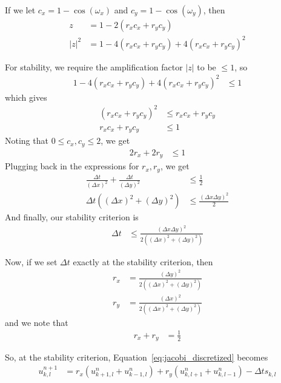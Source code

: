 \documentclass[twocolumn]{myarticle}
\numberwithin{equation}{section}
\begin{document}
If we let $ c_x = 1 - \cos\left( \omega_x \right) $ and $ c_y = 1 - \cos \left( \omega_y \right) $, then
\begin{align}
    z &= 1 - 2 \left(r_x c_x + r_y c_y \right)
    \\
    |z|^2 &= 1 - 4 \left( r_x c_x + r_y c_y \right) + 4 \left( r_x c_x + r_y c_y \right)^2
\end{align}

For stability, we require the amplification factor $ |z| $ to be $ \leq 1 $, so
\begin{align}
    1 - 4 \left( r_x c_x + r_y c_y \right) + 4 \left( r_x c_x + r_y c_y \right)^2 &\leq 1
\end{align}
which gives
\begin{align}
    \left( r_x c_x + r_y c_y \right)^2 &\leq r_x c_x + r_y c_y
    \\
    r_x c_x + r_y c_y &\leq 1
\end{align}
Noting that $ 0 \leq c_x, c_y \leq 2 $, we get
\begin{align}
    2 r_x + 2 r_y &\leq 1
\end{align}
Plugging back in the expressions for $ r_x, r_y $, we get
\begin{align}
    \frac{\Delta t}{\left( \Delta x \right)^2} + \frac{\Delta t}{\left( \Delta y \right)^2} &\leq \frac{1}{2}
    \\
    \Delta t \left( \left( \Delta x \right)^2 + \left( \Delta y \right)^2 \right) &\leq \frac{\left(\Delta x \Delta y \right)^2}{2}
\end{align}
And finally, our stability criterion is
\begin{align}
    \Delta t &\leq \frac{\left(\Delta x \Delta y \right)^2}{2 \left( \left( \Delta x \right)^2 + \left( \Delta y \right)^2 \right) }
\end{align}

Now, if we set $ \Delta t $ exactly at the stability criterion, then
\begin{align}
    r_x &= \frac{\left(\Delta y \right)^2}{2 \left( \left( \Delta x \right)^2 + \left( \Delta y \right)^2 \right) }
    \\
    r_y &= \frac{\left(\Delta x \right)^2}{2 \left( \left( \Delta x \right)^2 + \left( \Delta y \right)^2 \right) }
\end{align}
and we note that
\begin{align}
    r_x + r_y &= \frac{1}{2}
\end{align}

So, at the stability criterion, Equation~\ref{eq:jacobi_discretized} becomes
\begin{align}
    u^{n+1}_{k,l} &= r_x \left( u^n_{k+1, l} + u^n_{k-1,l} \right) + r_y \left( u^n_{k,l+1} + u^n_{k,l-1} \right) - \Delta t s_{k,l}
\end{align}
\end{document}
